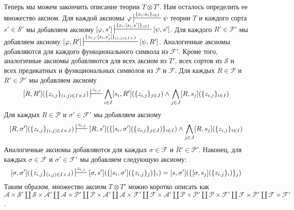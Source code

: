 \documentclass[reqno]{amsart}
\theoremstyle{definition}
\theoremstyle{remark}
\begin{document}
Теперь мы можем закончить описание теории $T \otimes T'$.
Нам осталось определить ее множество аксиом.
Для каждой аксиомы $\varphi \sststile{}{\{ x_i : s_i \}_{i \in I}} \psi$ теории $T$ и каждого сорта $s' \in \mathcal{S}'$ мы добавляем аксиому $[\varphi,s'] \sststile{}{\{ x_i : [s_i,s'] \}_{i \in I}} [\psi,s']$.
Для каждого $R' \in \mathcal{P}'$ мы добавляем аксиому $[\varphi,R'] \sststile{}{\{ z_{i,j} : [s_i,s_j'] \}_{(i,j) \in I \times J}} [\psi,R']$.
Аналогичные аксиомы добавляются для каждого функционального символа из $\mathcal{F}'$.
Кроме того, аналогичные аксиомы добавляются для всех аксиом из $T'$, всех сортов из $\mathcal{S}$ и всех предикатных и функциональных символов из $\mathcal{P}$ и $\mathcal{F}$.
Для каждых $R \in \mathcal{P}$ и $R' \in \mathcal{P}'$ мы добавляем аксиому
\[ [R,R'](\{ z_{i,j} \}_{(i,j) \in I \times J}) \sststile{}{z_{i,j}} \bigwedge_{i \in I} [s_i,R'](\{ z_{i,j} \}_{j \in J}) \land \bigwedge_{j \in J} [R,s_j](\{ z_{i,j} \}_{i \in I}) \]
Для каждых $R \in \mathcal{P}$ и $\sigma' \in \mathcal{F}'$ мы добавляем аксиому
\[ [R,\sigma'](\{ z_{i,j} \}_{(i,j) \in I \times J}) \sststile{}{z_{i,j}} [R,s'](\{ [s_i,\sigma'](\{ z_{i,j} \}_{j \in J}) \}_{i \in I}) \land \bigwedge_{j \in J} [R,s_j](\{ z_{i,j} \}_{i \in I}) \]
Аналогичные аксиомы добавляются для каждых $\sigma \in \mathcal{F}$ и $R' \in \mathcal{P}'$.
Наконец, для каждых $\sigma \in \mathcal{F}$ и $\sigma' \in \mathcal{F}'$ мы добавляем следующую аксиому:
\[ [\sigma,\sigma'](\{ z_{i,j} \}_{(i,j) \in I \times J}) \sststile{}{z_{i,j}} [\sigma,s'](\{ [s_i,\sigma'](\{ z_{i,j} \}_j) \}_i) = [s,\sigma'](\{ [\sigma,s_j](\{ z_{i,j} \}_i) \}_j) \]
Таким образом, множество аксиом $T \otimes T'$ можно коротко описать как $\mathcal{A} \times \mathcal{S}' \amalg \mathcal{S} \times \mathcal{A}' \amalg \mathcal{A} \times \mathcal{P}' \amalg \mathcal{P} \times \mathcal{A}' \amalg \mathcal{A} \times \mathcal{F}' \amalg \mathcal{F} \times \mathcal{A}' \amalg \mathcal{P} \times \mathcal{P}' \amalg \mathcal{P} \times \mathcal{F}' \amalg \mathcal{F} \times \mathcal{P}' \amalg \mathcal{F} \times \mathcal{F}'$.
\end{document}
